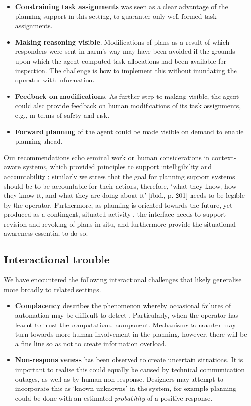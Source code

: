 \begin{itemize}
\item  \textbf{Constraining task assignments} was seen as a clear advantage of the planning support in this setting, to guarantee only well-formed task assignments.
\item \textbf{Making reasoning visible}. Modifications of plans as a result of which responders were sent in harm's way may have been avoided if the grounds upon which the agent computed task allocations had been available for inspection. The challenge is how to implement this without inundating the operator with information.
\item \textbf{Feedback on modifications}. As further step to making visible, the agent could also provide feedback on human modifications of its task assignments, e.g., in terms of safety and risk.
\item \textbf{Forward planning} of the agent could be made visible on demand to enable planning ahead. 
\end{itemize}

Our recommendations echo seminal work on human considerations in context-aware systems, which provided principles to support intelligibility and accountability \cite{Bellotti2001}; similarly we stress that the goal for planning support systems should be  to be accountable for their actions, therefore, `what they know, how they know it, and what they are doing about it' [ibid., p. 201] needs to be legible by the operator. Furthermore, as planning is oriented towards the future, yet produced as a contingent, situated activity \cite{Suchman1987}, the interface needs to support revision and revoking of plans in situ, and furthermore provide the situational awareness essential to do so.  

\subsection{Interactional trouble}
We have encountered the following interactional challenges that likely generalise more broadly to related settings.
\begin{itemize}

\item \textbf{Complacency} describes the phenomenon whereby occasional failures of automation may be difficult to detect \cite{Kaber1997}. Particularly, when the operator has learnt to trust the computational component. Mechanisms to counter may turn towards more human involvement in the planning, however, there will be a fine line so as not to create information overload. 
\item \textbf{Non-responsiveness} has been observed to create uncertain situations. It is important to realise this could equally be caused by technical communication outages, as well as by human non-response. Designers may attempt to incorporate this as  `known unknowns' in the system, for example planning could be done with an estimated \textit{probability} of a positive response. 
\end{itemize}   


